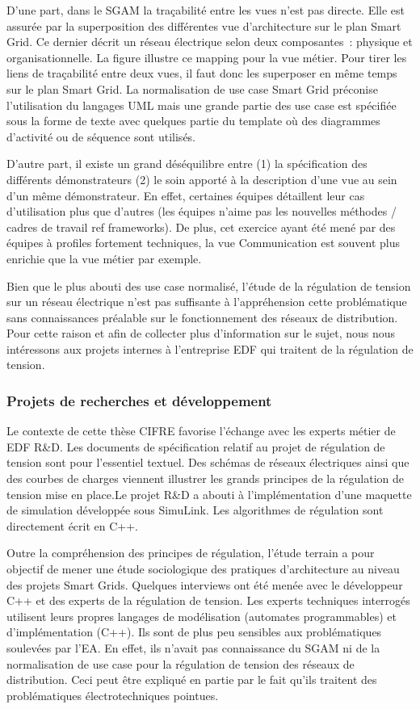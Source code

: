 D'une part, dans le SGAM la traçabilité entre les vues n'est pas directe. Elle 
est assurée par la superposition des différentes vue d'architecture sur le plan 
Smart Grid. Ce dernier décrit un réseau électrique selon deux composantes~: 
physique et organisationnelle. La figure illustre ce mapping pour la vue métier. 
Pour tirer les liens de traçabilité entre deux vues, il faut donc les superposer 
en même temps sur le plan Smart Grid. La normalisation de use case Smart Grid 
préconise l'utilisation du langages UML mais une grande partie des use case est 
spécifiée sous la forme de texte avec quelques partie du template où des 
diagrammes d'activité ou de séquence sont utilisés. 

D'autre part, il existe un grand déséquilibre entre (1) la spécification des 
différents démonstrateurs (2) le soin apporté à la description d'une vue au sein 
d'un même démonstrateur. En effet, certaines équipes détaillent leur cas 
d'utilisation plus que d'autres (les équipes n'aime pas les nouvelles méthodes / 
cadres de travail ref frameworks).  De plus, cet exercice ayant été mené par des 
équipes à profiles fortement techniques, la vue Communication est souvent plus 
enrichie que la vue métier par exemple.  

Bien que le plus abouti des use case normalisé, l'étude de la régulation de 
tension sur un  réseau électrique n'est pas suffisante à l'appréhension cette 
problématique sans connaissances préalable sur le fonctionnement des réseaux de 
distribution. Pour cette raison et afin de collecter plus d'information sur le 
sujet, nous nous intéressons aux projets internes à l'entreprise EDF qui 
traitent de la régulation de tension.
 

\subsubsection{Projets de recherches et développement}

Le contexte de cette thèse CIFRE favorise l'échange avec les experts métier de 
EDF R\&D. Les documents de spécification relatif au projet de régulation de 
tension sont pour l'essentiel textuel. Des schémas de réseaux électriques ainsi 
que des courbes de charges viennent illustrer les grands principes de la 
régulation de tension mise en place.Le projet R\&D a abouti à l'implémentation 
d'une maquette de simulation 
développée sous SimuLink. Les algorithmes de régulation sont directement écrit 
en C++. 

Outre la compréhension des principes de régulation, l'étude terrain a pour 
objectif de mener une étude sociologique des pratiques d'architecture au niveau 
des projets Smart Grids. Quelques interviews ont été menée avec le développeur 
C++  et des experts de la régulation de tension. Les experts techniques 
interrogés utilisent leurs propres langages de modélisation (automates 
programmables) et d'implémentation (C++). Ils sont de plus peu sensibles aux 
problématiques soulevées par l'EA. En effet, ils n'avait pas connaissance du 
SGAM ni de la normalisation de use case pour la régulation de tension des 
réseaux de distribution. Ceci peut être expliqué en partie par le fait qu'ils 
traitent des problématiques électrotechniques pointues. 

